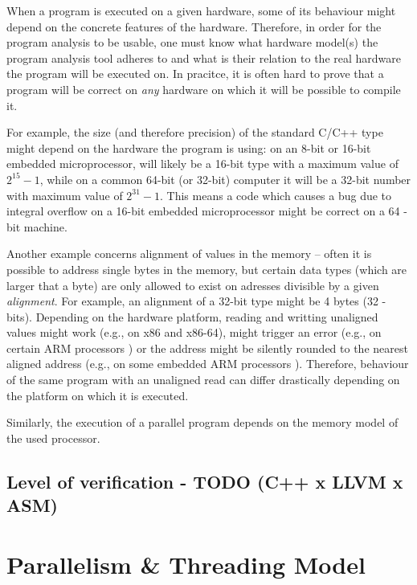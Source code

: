 When a program is executed on a given hardware, some of its behaviour might
depend on the concrete features of the hardware.
Therefore, in order for the program analysis to be usable, one must know what
hardware model(s) the program analysis tool adheres to and what is their
relation to the real hardware the program will be executed on.
In pracitce, it is often hard to prove that a program will be correct on
\emph{any} hardware on which it will be possible to compile it.

For example, the size (and therefore precision) of the standard C/C++ type
 might depend on the hardware the program is using: on an 8-bit or
16-bit embedded microprocessor,  will likely be a 16-bit type with a
maximum value of $2^{15} - 1$, while on a common 64-bit (or 32-bit) computer it
will be a 32-bit number with maximum value of $2^{31}-1$.
This means a code which causes a bug due to integral overflow on a 16-bit
embedded microprocessor might be correct on a 64 -bit machine.

Another example concerns alignment of values in the memory -- often it is
possible to address single bytes in the memory, but certain data types (which
are larger that a byte) are only allowed to exist on adresses divisible by a
given \emph{alignment}.
For example, an alignment of a 32-bit  type might be 4 bytes (32
-bits).
Depending on the hardware platform, reading and writting unaligned values might
work (e.g., on x86 and x86-64), might trigger an error (e.g., on certain ARM
processors \cite{??}) or the address might be silently rounded to the nearest
aligned address (e.g., on some embedded ARM processors \cite{??}).
Therefore, behaviour of the same program with an unaligned read can differ
drastically depending on the platform on which it is executed.

Similarly, the execution of a parallel program depends on the memory model of
the used processor.

\subsection{Level of verification - TODO (C++ x LLVM x ASM)}


\section{Parallelism \& Threading Model} %

